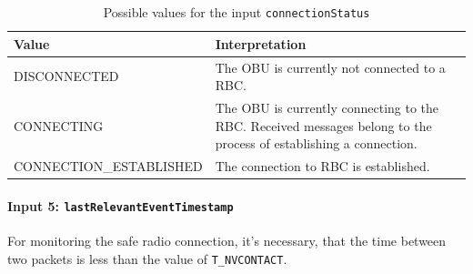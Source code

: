 \documentclass{template/openetcs_report}
\begin{document}
\begin{table}[H]
  \begin{tabular}{| l | p{9cm} |}
    \hline
    \textbf{Value} & \textbf{Interpretation}\\ \hline
    DISCONNECTED & The OBU is currently not connected to a RBC.\\
    CONNECTING & The OBU is currently connecting to the RBC. Received messages belong to the process of establishing a connection.\\
    CONNECTION\_ESTABLISHED &  The connection to RBC is established.\\
    \hline
  \end{tabular} 
  \caption{Possible values for the input \texttt{connectionStatus}}
  \label{tbl:connectionStatus}
\end{table}

% 
% 
% 

\paragraph{Input 5: \texttt{lastRelevantEventTimestamp}}

For monitoring the safe radio connection, it's necessary, that the time between two packets is less than the value of \texttt{T\_NVCONTACT}.
\end{document}
